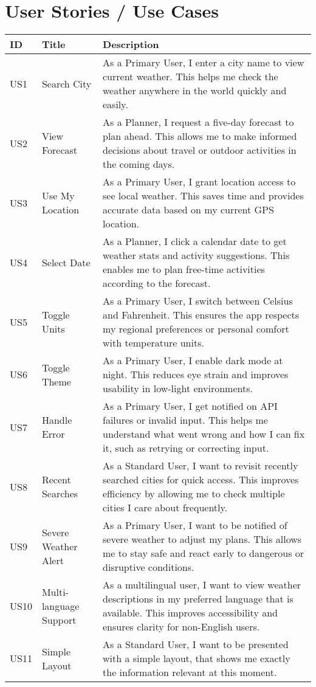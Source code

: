 \documentclass[fontsize=13pt,a4paper]{scrartcl}
\begin{document}
\section{User Stories / Use Cases}
\begin{longtable}{|p{1cm}|p{3cm}|p{10cm}|}
\hline
\textbf{ID} & \textbf{Title} & \textbf{Description} \\
\hline
US1 & Search City & As a Primary User, I enter a city name to view current weather. This helps me check the weather anywhere in the world quickly and easily. \\
\hline
US2 & View Forecast & As a Planner, I request a five-day forecast to plan ahead. This allows me to make informed decisions about travel or outdoor activities in the coming days. \\
\hline
US3 & Use My Location & As a Primary User, I grant location access to see local weather. This saves time and provides accurate data based on my current GPS location. \\
\hline
US4 & Select Date & As a Planner, I click a calendar date to get weather stats and activity suggestions. This enables me to plan free-time activities according to the forecast. \\
\hline
US5 & Toggle Units & As a Primary User, I switch between Celsius and Fahrenheit. This ensures the app respects my regional preferences or personal comfort with temperature units. \\
\hline
US6 & Toggle Theme & As a Primary User, I enable dark mode at night. This reduces eye strain and improves usability in low-light environments. \\
\hline
US7 & Handle Error & As a Primary User, I get notified on API failures or invalid input. This helps me understand what went wrong and how I can fix it, such as retrying or correcting input. \\
\hline
US8 & Recent Searches & As a Standard User, I want to revisit recently searched cities for quick access. This improves efficiency by allowing me to check multiple cities I care about frequently. \\
\hline
US9 & Severe Weather Alert & As a Primary User, I want to be notified of severe weather to adjust my plans. This allows me to stay safe and react early to dangerous or disruptive conditions. \\
\hline
US10 & Multi-language Support & As a multilingual user, I want to view weather descriptions in my preferred language that is available. This improves accessibility and ensures clarity for non-English users. \\
\hline
US11 & Simple Layout & As a Standard User, I want to be presented with a simple layout, that shows me exactly the information relevant at this moment.
\end{longtable}
\end{document}
